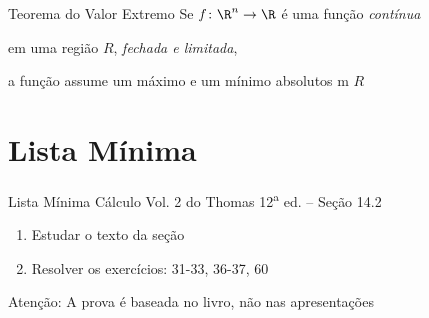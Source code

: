 \begin{frame}{Teorema do Valor Extremo}
  Se \(f\colon\R^n\to\R\) é uma função \emph{contínua}

  \pause
  em uma região $R$, \emph{fechada e limitada},

  \pause
  a função assume um máximo e um mínimo absolutos m $R$
\end{frame}

\section{Lista Mínima}

\begin{frame}{Lista Mínima}
  Cálculo Vol. 2 do Thomas 12\textsuperscript{a} ed. -- Seção 14.2
  \begin{enumerate}
    \item Estudar o texto da seção
    \item Resolver os exercícios: 31-33, 36-37, 60
  \end{enumerate}

  \vfill
  Atenção: A prova é baseada no livro, não nas apresentações
\end{frame}


